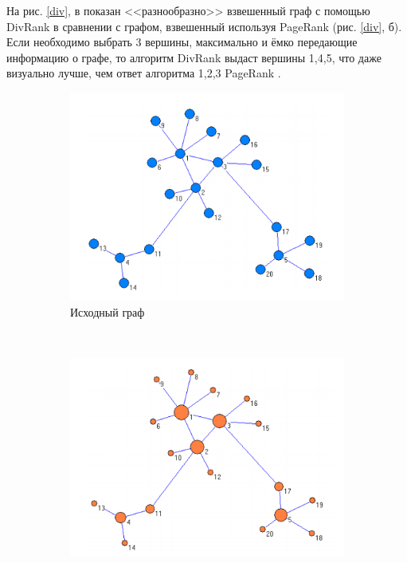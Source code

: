 \documentclass[a4paper, 14pt]{extarticle}
\begin{document}
На рис. \ref{div}, в показан <<разнообразно>> взвешенный граф с помощью DivRank в сравнении с графом, взвешенный используя PageRank (рис. \ref{div}, б). Если необходимо выбрать 3 вершины, максимально и ёмко передающие информацию о графе, то алгоритм DivRank выдаст вершины 1,4,5, что даже визуально лучше, чем ответ алгоритма 1,2,3 PageRank \cite{Mei10divrank:the}. 
\begin{figure}[h]
	\centering
	\begin{subfigure}[b]{0.3\textwidth}
		\includegraphics[width=\textwidth]{NoR}
		\caption{Исходный граф}
	\end{subfigure}
	~
	\begin{subfigure}[b]{0.3\textwidth}
		\includegraphics[width=\textwidth]{PageR}

\end{subfigure}
\end{figure}
\end{document}
